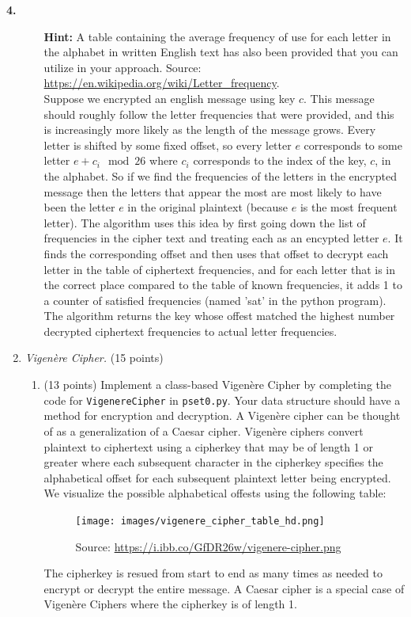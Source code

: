 \documentclass[12pt]{amsart}
\newenvironment{statement}[1]{\smallskip\noindent\color[rgb]{0.0,0.0,0.0} {\bf #1.}}{}
\theoremstyle{definition}
\theoremstyle{remark}
\newcommand{\1}{\mathds{1}}
\begin{document}
\begin{statement}{4}
\begin{enumerate}
\begin{enumerate}
            \noindent\textbf{Hint:} A table containing the average frequency of use for each letter in the alphabet in written English text has also been provided that you can utilize in your approach. Source: \href{https://en.wikipedia.org/wiki/Letter\_frequency}{https://en.wikipedia.org/wiki/Letter\_frequency}.
            \\ Suppose we encrypted an english message using key $c$. This message should roughly follow the letter frequencies 
            that were provided, and this is increasingly more likely as the length of the message grows. Every letter is shifted by some fixed offset, so every letter 
            $e$ corresponds to some letter $e + c_i \mod 26$ where $c_i$ corresponds to the index of the key, $c$, in the alphabet. So if we find the frequencies of the letters in the encrypted message then 
            the letters that appear the most are most likely to have been the letter $e$ in the original plaintext (because $e$ is the most frequent letter). The algorithm uses this idea by first going down the list of frequencies in the cipher text and 
            treating each as an encypted letter $e$. It finds the corresponding offset and then uses that offset to decrypt each letter in the table of ciphertext frequencies, and for each 
            letter that is in the correct place compared to the table of known frequencies, it adds 1 to a counter of satisfied frequencies (named 'sat' in the python program). The algorithm 
            returns the key whose offest matched the highest number decrypted ciphertext frequencies to actual letter frequencies. 
        \end{enumerate}
      
    
    \item \textit{Vigen\`ere Cipher.} (15 points)
        \begin{enumerate}
            \item (13 points) Implement a class-based Vigenère Cipher by completing the code for \texttt{VigenereCipher} in \texttt{pset0.py}. Your data structure should have a method for encryption and decryption. A Vigenère cipher can be thought of as a generalization of a Caesar cipher. Vigenère ciphers convert plaintext to ciphertext using a cipherkey that may be of length 1 or greater where each subsequent character in the cipherkey specifies the alphabetical offset for each subsequent plaintext letter being encrypted. We visualize the possible alphabetical offests using the following table:
            
            \begin{figure}[H]
            \centering
                \texttt{[image: images/vigenere\_cipher\_table\_hd.png]}
                \caption{Source:  \href{https://i.ibb.co/GfDR26w/vigenere-cipher.png}{https://i.ibb.co/GfDR26w/vigenere-cipher.png}}
            \end{figure}
            The cipherkey is resued from start to end as many times as needed to encrypt or decrypt the entire message. A Caesar cipher is a special case of Vigenère Ciphers where the cipherkey is of length 1. 
            

\end{enumerate}
\end{enumerate}
\end{statement}
\end{document}
